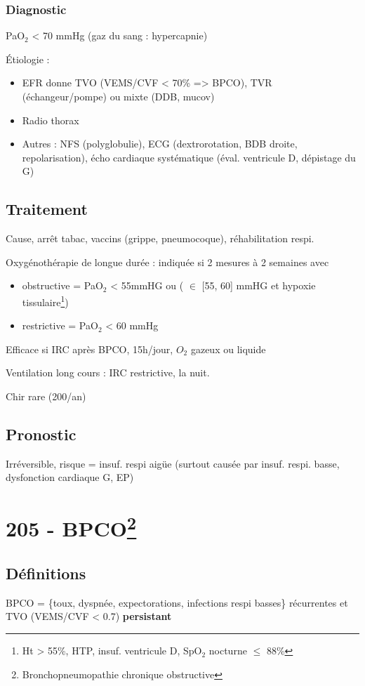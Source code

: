 \subsubsection{Diagnostic}
\label{sec:org7599c0f}
PaO\(_{\text{2}}\) < 70 mmHg (gaz du sang : hypercapnie)

Étiologie :
\begin{itemize}
\item EFR donne TVO (VEMS/CVF < 70\% => BPCO), TVR (échangeur/pompe) ou
mixte (DDB, mucov)
\item  Radio thorax
\item Autres : NFS (polyglobulie), ECG (dextrorotation, BDB droite, repolarisation),
écho cardiaque systématique (éval. ventricule D, dépistage du G)
\end{itemize}

\subsection{Traitement}
\label{sec:org870a2d5}
Cause, arrêt tabac, vaccins (grippe, pneumocoque), réhabilitation respi.

Oxygénothérapie de longue durée : indiquée si 2 mesures à 2 semaines avec
\begin{itemize}
\item obstructive = PaO\(_{\text{2}}\) < 55mmHG ou ( \(\in\) [55, 60] mmHG et hypoxie
  tissulaire\footnote{Ht > 55\%, HTP, insuf. ventricule D, SpO\(_{\text{2}}\) nocturne \(\le\) 88\%})
\item restrictive = PaO\(_{\text{2}}\) < 60 mmHg
\end{itemize}
Efficace si  IRC après BPCO, 15h/jour, $O_2$ gazeux ou liquide

Ventilation long cours : IRC restrictive, la nuit.

Chir rare (200/an)

\subsection{Pronostic}
\label{sec:org2ec66b4}
Irréversible, risque = insuf. respi aigüe (surtout causée par insuf. respi. basse, dysfonction
cardiaque G, EP)


\section{205 - BPCO\footnote{Bronchopneumopathie chronique obstructive}}
\label{sec:205-bpco}

\subsection{Définitions}
BPCO = \{toux, dyspnée, expectorations, infections respi basses\} récurrentes et
TVO (VEMS/CVF < 0.7)
\textbf{persistant}

